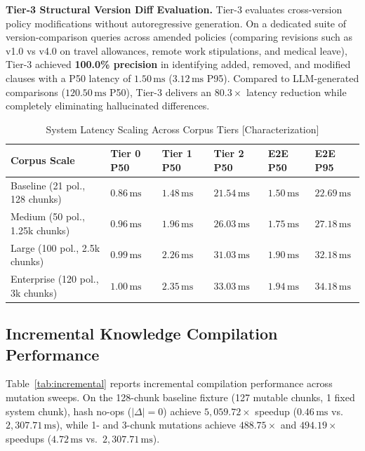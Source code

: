 \documentclass[journal]{IEEEtran}
\newcommand{\ms}{\,\mathrm{ms}}
\begin{document}
\textbf{Tier-3 Structural Version Diff Evaluation.} Tier-3 evaluates cross-version policy modifications without autoregressive generation. On a dedicated suite of version-comparison queries across amended policies (comparing revisions such as v1.0 vs v4.0 on travel allowances, remote work stipulations, and medical leave), Tier-3 achieved \textbf{100.0\% precision} in identifying added, removed, and modified clauses with a P50 latency of \textbf{$1.50\ms$} ($3.12\ms$ P95). Compared to LLM-generated comparisons ($120.50\ms$ P50), Tier-3 delivers an $80.3\times$ latency reduction while completely eliminating hallucinated differences.

\begin{table}[!t]
\caption{System Latency Scaling Across Corpus Tiers [Characterization]}
\label{tab:scalability}
\centering
\scriptsize
\setlength{\tabcolsep}{1.4pt}
\renewcommand{\arraystretch}{0.85}
\begin{tabularx}{\columnwidth}{>{\raggedright\arraybackslash}p{2.1cm}YYYYY}
\toprule
\textbf{Corpus Scale} & \textbf{Tier 0 P50} & \textbf{Tier 1 P50} & \textbf{Tier 2 P50} & \textbf{E2E P50} & \textbf{E2E P95}\\
\midrule
Baseline (21 pol., 128 chunks) & $0.86\ms$ & $1.48\ms$ & $21.54\ms$ & $1.50\ms$ & $22.69\ms$\\
Medium (50 pol., 1.25k chunks) & $0.96\ms$ & $1.96\ms$ & $26.03\ms$ & $1.75\ms$ & $27.18\ms$\\
Large (100 pol., 2.5k chunks) & $0.99\ms$ & $2.26\ms$ & $31.03\ms$ & $1.90\ms$ & $32.18\ms$\\
Enterprise (120 pol., 3k chunks) & $1.00\ms$ & $2.35\ms$ & $33.03\ms$ & $1.94\ms$ & $34.18\ms$\\
\bottomrule
\end{tabularx}
\end{table}

\subsection{Incremental Knowledge Compilation Performance}
Table~\ref{tab:incremental} reports incremental compilation performance across mutation sweeps. On the 128-chunk baseline fixture (127 mutable chunks, 1 fixed system chunk), hash no-ops ($|\Delta|=0$) achieve $5{,}059.72\times$ speedup ($0.46\ms$ vs.\ $2,307.71\ms$), while 1- and 3-chunk mutations achieve $488.75\times$ and $494.19\times$ speedups ($4.72\ms$ vs.\ $2,307.71\ms$).
\end{document}
